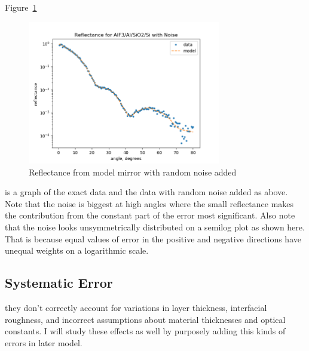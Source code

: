 \documentclass[english]{scrartcl}
\begin{document}
Figure~\ref{fig:noise}
\begin{figure}[htb]
  \begin{center}
    \includegraphics[width=0.75\textwidth]{images/noise}
  \end{center}
  \caption{\label{fig:noise}Reflectance from model mirror with random
  noise added}
\end{figure}
is a graph of the exact data and the data with
random noise added as above. Note that the noise is biggest at high
angles where the small reflectance makes the contribution from the
constant part of the error most significant. Also note that the noise
looks unsymmetrically distributed on a semilog plot as shown here.
That is because equal values of error in the positive and negative
directions have unequal weights on a logarithmic scale.

\subsection{Systematic Error}\label{sec:syserr}
they don't correctly account for variations in layer thickness, interfacial
roughness, and incorrect assumptions about material thicknesses and
optical constants. I will study these effects as well by purposely adding
this kinds of errors in later model.
\end{document}
